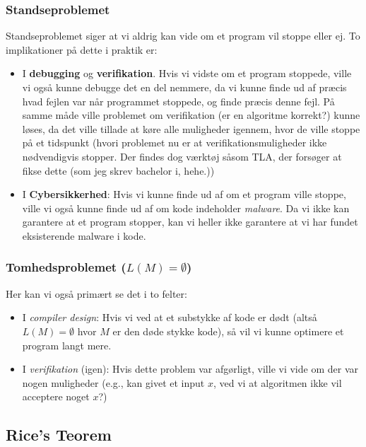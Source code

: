 \subsubsection{Standseproblemet}
Standseproblemet siger at vi aldrig kan vide om et program vil stoppe eller ej. To implikationer på dette i praktik er:
\begin{itemize}
  \item I \textbf{debugging} og \textbf{verifikation}. Hvis vi vidste om et program stoppede, ville vi også kunne debugge det en del nemmere, da vi kunne finde ud af præcis hvad fejlen var når programmet stoppede, og finde præcis denne fejl. På samme måde ville problemet om verifikation (er en algoritme korrekt?) kunne løses, da det ville tillade at køre alle muligheder igennem, hvor de ville stoppe på et tidspunkt (hvori problemet nu er at verifikationsmuligheder ikke nødvendigvis stopper. Der findes dog værktøj såsom TLA, der forsøger at fikse dette (som jeg skrev bachelor i, hehe.))
  \item I \textbf{Cybersikkerhed}: Hvis vi kunne finde ud af om et program ville stoppe, ville vi også kunne finde ud af om kode indeholder \textit{malware}. Da vi ikke kan garantere at et program stopper, kan vi heller ikke garantere at vi har fundet eksisterende malware i kode.
\end{itemize}

\subsubsection{Tomhedsproblemet ($L(M) = \emptyset$)}
Her kan vi også primært se det i to felter:
\begin{itemize}
  \item I \textit{compiler design}: Hvis vi ved at et substykke af kode er dødt (altså $L(M) = \emptyset$ hvor $M$ er den døde stykke kode), så vil vi kunne optimere et program langt mere.
  \item I \textit{verifikation} (igen): Hvis dette problem var afgørligt, ville vi vide om der var nogen muligheder (e.g., kan givet et input $x$, ved vi at algoritmen ikke vil acceptere noget $x$?)
\end{itemize}



\subsection{Rice's Teorem}%
\label{subsec:ricetheorem}

